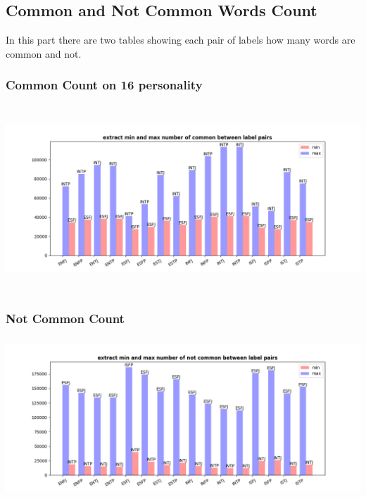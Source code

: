 \documentclass[10pt, a4paper]{article}
\begin{document}
\subsection{Common and Not Common Words Count}
In this part there are two tables showing each pair of labels how many words are common and not.

\subsubsection{Common Count on 16 personality}
\begin{adjustbox}{max width=\textwidth,totalheight=2in}
\end{adjustbox}
\begin{center}
    \includegraphics[width = \textwidth, height=7cm]{../stats/common_count.png}
\end{center}

\subsubsection{Not Common Count}

\begin{adjustbox}{max width=\textwidth,totalheight=2in}
\end{adjustbox}
\begin{center}
    \includegraphics[width = \textwidth, height=6cm]{../stats/not_common_count.png}
\end{center}
\end{document}
